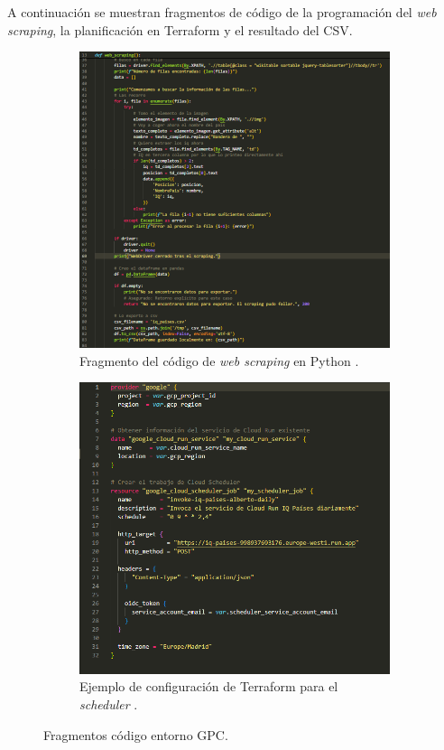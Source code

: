 A continuación se muestran fragmentos de código de la programación del \textit{web scraping}, la planificación en Terraform y el resultado del CSV. 
\begin{figure}[H]
\centering
\begin{subfigure}[b]{0.48\textwidth}
\centering
\includegraphics[width=\textwidth]{figuras/captura_webscraping.png}
\caption[Fragmento del código de web scrapping]{Fragmento del código de \textit{web scraping} en Python \cite{AlcamsodMemoria}.}
\label{webscraping}
\end{subfigure}
\hfill
\begin{subfigure}[b]{0.49\textwidth}
\centering
\includegraphics[width=\textwidth]{figuras/captura_terraform.png}
\caption[Fragmento del código del scheduler]{Ejemplo de configuración de Terraform para el \textit{scheduler} \cite{AlcamsodMemoria}.}
\label{terraform}
\end{subfigure}
\caption{Fragmentos código entorno GPC.}
\label{TerraformWebScraping}
\end{figure}
